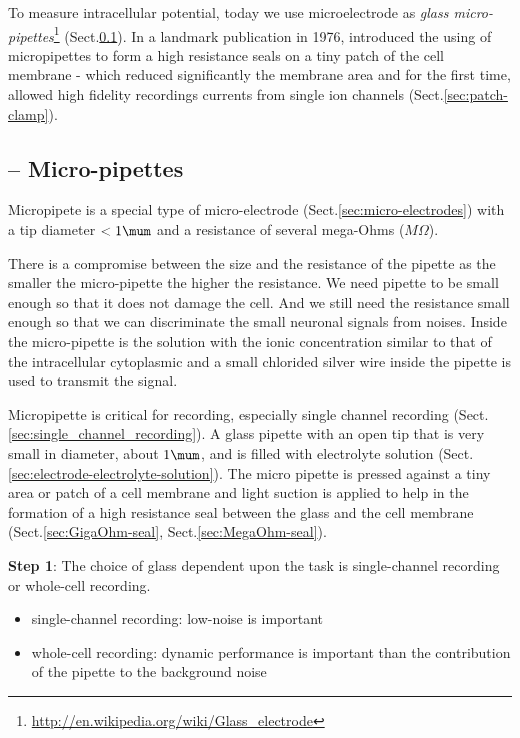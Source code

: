 To measure intracellular potential, today we use microelectrode as {\it glass
micro-pipettes}\footnote{\url{http://en.wikipedia.org/wiki/Glass_electrode}}
(Sect.\ref{sec:micro-pipette}). In a landmark publication in 1976,
\citep{neher1976} introduced the using of micropipettes to form a high
resistance seals on a tiny patch of the cell membrane - which reduced
significantly the membrane area and for the first time, allowed high fidelity
recordings currents from single ion channels (Sect.\ref{sec:patch-clamp}).


\subsection{-- Micro-pipettes}
\label{sec:micro-pipette}

Micropipete is a special type of micro-electrode
(Sect.\ref{sec:micro-electrodes}) with a tip diameter $<1\mum$ and a resistance
of several mega-Ohms ($M\Omega$).

There is a compromise between the size and the resistance of the pipette as the
smaller the micro-pipette the higher the resistance. We need pipette to be small
enough so that it does not damage the cell. And we still need the resistance
small enough so that we can discriminate the small neuronal signals from noises.
Inside the micro-pipette is the solution with the ionic concentration similar to
that of the intracellular cytoplasmic and a small chlorided silver wire inside
the pipette is used to transmit the signal.

Micropipette is critical for recording, especially single channel recording
(Sect.\ref{sec:single_channel_recording}). A glass pipette with an open tip that
is very small in diameter, about $1\mum$, and is filled with electrolyte
solution (Sect.\ref{sec:electrode-electrolyte-solution}). The micro pipette is
pressed against a tiny area or patch of a cell membrane and light suction is
applied to help in the formation of a high resistance seal between the glass and
the cell membrane (Sect.\ref{sec:GigaOhm-seal}, Sect.\ref{sec:MegaOhm-seal}).

{\bf Step 1}: The choice of glass dependent upon the task is
single-channel recording or whole-cell recording.
\begin{itemize}
  \item single-channel recording: low-noise is important

  \item whole-cell recording: dynamic performance is important than the
  contribution of the pipette to the background noise
\end{itemize}



